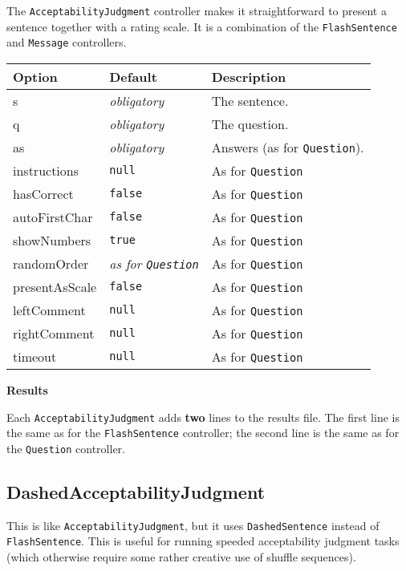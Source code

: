 \documentclass[]{article}
\begin{document}
The \texttt{AcceptabilityJudgment} controller makes it straightforward
to present a sentence together with a rating scale. It is a combination
of the \texttt{FlashSentence} and \texttt{Message} controllers.

\begin{longtable}[c]{p{1in}p{1in}p{3.85in}}
\toprule
\textbf{Option} & \textbf{Default} & \textbf{Description}\tabularnewline
\midrule
\endhead
s & \emph{obligatory} & The sentence.\tabularnewline
q & \emph{obligatory} & The question.\tabularnewline
as & \emph{obligatory} & Answers (as for
\texttt{Question}).\tabularnewline
instructions & \texttt{null} & As for \texttt{Question}\tabularnewline
hasCorrect & \texttt{false} & As for \texttt{Question}\tabularnewline
autoFirstChar & \texttt{false} & As for \texttt{Question}\tabularnewline
showNumbers & \texttt{true} & As for \texttt{Question}\tabularnewline
randomOrder & \emph{as for \texttt{Question}} & As for
\texttt{Question}\tabularnewline
presentAsScale & \texttt{false} & As for
\texttt{Question}\tabularnewline
leftComment & \texttt{null} & As for \texttt{Question}\tabularnewline
rightComment & \texttt{null} & As for \texttt{Question}\tabularnewline
timeout & \texttt{null} & As for \texttt{Question}\tabularnewline
\bottomrule
\end{longtable}

\textbf{Results}

Each \texttt{AcceptabilityJudgment} adds \textbf{two} lines to the
results file. The first line is the same as for the
\texttt{FlashSentence} controller; the second line is the same as for
the \texttt{Question} controller.

\subsection{DashedAcceptabilityJudgment}\label{dashedacceptabilityjudgment}

This is like \texttt{AcceptabilityJudgment}, but it uses
\texttt{DashedSentence} instead of \texttt{FlashSentence}. This is
useful for running speeded acceptability judgment tasks (which otherwise
require some rather creative use of shuffle sequences).
\end{document}
